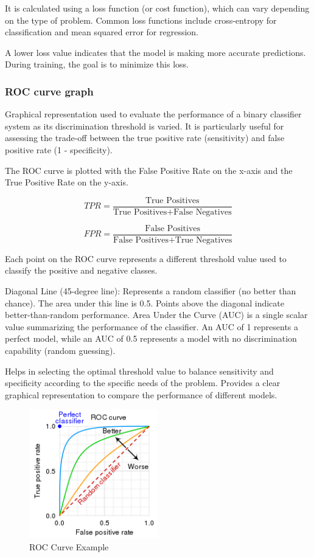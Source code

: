 \documentclass[conference]{IEEEtran}
\begin{document}
It is calculated using a loss function (or cost function), which can vary depending on the type of problem. Common loss functions include cross-entropy for classification and mean squared error for regression.

A lower loss value indicates that the model is making more accurate predictions. During training, the goal is to minimize this loss.

\subsubsection{ROC curve graph}

Graphical representation used to evaluate the performance of a binary classifier system as its discrimination threshold is varied. It is particularly useful for assessing the trade-off between the true positive rate (sensitivity) and false positive rate (1 - specificity).

The ROC curve is plotted with the False Positive Rate on the x-axis and the True Positive Rate on the y-axis.

\[ TPR = \frac{\text{True Positives}}{\text{True Positives} + \text{False Negatives}} \]

\[ FPR = \frac{\text{False Positives}}{\text{False Positives} + \text{True Negatives}} \]

Each point on the ROC curve represents a different threshold value used to classify the positive and negative classes.

Diagonal Line (45-degree line): Represents a random classifier (no better than chance). The area under this line is 0.5. Points above the diagonal indicate better-than-random performance. Area Under the Curve (AUC) is a single scalar value summarizing the performance of the classifier. An AUC of 1 represents a perfect model, while an AUC of 0.5 represents a model with no discrimination capability (random guessing).

Helps in selecting the optimal threshold value to balance sensitivity and specificity according to the specific needs of the problem. Provides a clear graphical representation to compare the performance of different models.

\begin{figure}[H]
\centering
    \includegraphics[width=0.5\textwidth]{images/RocCurveExample.svg.png}
    \caption{ROC Curve Example}
\end{figure}
\end{document}
